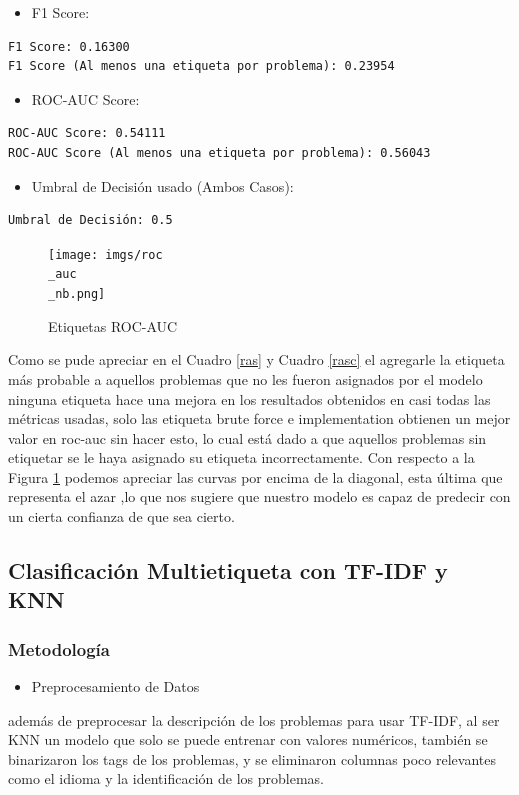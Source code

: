 \documentclass{article}
\begin{document}
\begin{itemize}
    \item F1 Score:
\end{itemize}
\begin{verbatim}
F1 Score: 0.16300
F1 Score (Al menos una etiqueta por problema): 0.23954
\end{verbatim}
\begin{itemize}
    \item ROC-AUC Score:
\end{itemize}
\begin{verbatim}
ROC-AUC Score: 0.54111
ROC-AUC Score (Al menos una etiqueta por problema): 0.56043
\end{verbatim}
\begin{itemize}
    \item Umbral de Decisi\'on usado (Ambos Casos):
\end{itemize}
\begin{verbatim}
Umbral de Decisión: 0.5
\end{verbatim}
\begin{figure}[H]
    \centering
    \texttt{[image: imgs/roc\\\_auc\\\_nb.png]}
    \caption{Etiquetas ROC-AUC}\label{fig:ranb}
\end{figure}
Como se pude apreciar en el Cuadro \ref{ras} y Cuadro \ref{rasc} el agregarle la etiqueta más probable a aquellos problemas que no les fueron asignados por el modelo ninguna etiqueta hace una mejora en los resultados obtenidos en casi todas las métricas usadas, solo las etiqueta brute force  e implementation obtienen un mejor valor en roc-auc sin hacer esto, lo cual está dado a que aquellos problemas sin etiquetar se le haya asignado su etiqueta incorrectamente. Con respecto a la Figura  \ref{fig:ranb} podemos apreciar las curvas por encima de la diagonal, esta última que representa el azar ,lo que nos sugiere que nuestro modelo es capaz de predecir con un cierta confianza de que sea cierto.

\newpage

\subsection{Clasificación Multietiqueta con TF-IDF y KNN}
\subsubsection{Metodología}
\begin{itemize}
    \item Preprocesamiento de Datos
\end{itemize}
además de preprocesar la descripción de los problemas para usar TF-IDF, al ser KNN un modelo que solo se puede entrenar con valores numéricos, también se binarizaron los tags de los problemas, y se eliminaron columnas poco relevantes como el idioma y la identificación de los problemas.
\end{document}
